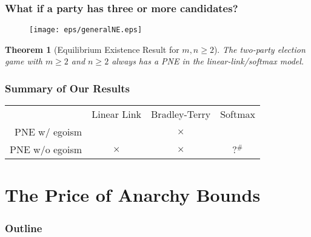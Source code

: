 \documentclass[xcolor=dvipsnames,envcountsect]{beamer}
\newtheorem*{theory}{Theorem}
\begin{document}
\begin{frame}
\frametitle{What if a party has three or more candidates?}
\begin{figure}
	\begin{center}
		\texttt{[image: eps/generalNE.eps]}
	\end{center}
\end{figure}
\pause
\begin{theory}[Equilibrium Existence Result for $m,n\geq 2$]
	The two-party election game with $m\geq 2$ and $n\geq 2$ always has a PNE in the linear-link/softmax model. \Smiley
\end{theory}
\end{frame}


\begin{frame}
\frametitle{Summary of Our Results}
\begin{table}[ht]
\begin{center}
	\renewcommand{\arraystretch}{1.25}
	\begin{tabular}{ r|c|c|c| }
		 \multicolumn{1}{r}{}
		&  \multicolumn{1}{r}{Linear Link}
		&  \multicolumn{1}{r}{Bradley-Terry}
		&  \multicolumn{1}{r}{Softmax}\\
		\cline{2-4}
		PNE w/ egoism & \checkmark & $\times$ & \checkmark \\
		PNE w/o egoism & $\times$ & $\times$ & ?$^{\#}$  \\
		\cline{2-4}
	\end{tabular}
	\vspace{7pt}
\label{tab:summary}
\end{center}
\end{table}

\end{frame}


\section{The Price of Anarchy Bounds}


\begin{frame}
\frametitle{Outline}
\end{frame}
\end{document}
